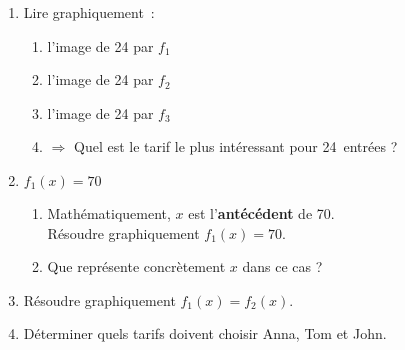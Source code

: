 \begin{enumerate}[1)~~~]

\item Lire graphiquement~:
		\begin{enumerate}
			\item l'image de 24 par $f_1~$	%
			\item l'image de 24 par $f_2~$	%
			\item l'image de 24 par $f_3~$	%
			\item $\Longrightarrow$ Quel est le tarif le plus intéressant pour 24~entrées ?	%
		\end{enumerate}


\newpage

\item $f_1(x)=70$
		\begin{enumerate}
			\item Mathématiquement, $x$ est l'\textbf{antécédent} de 70.\\ Résoudre graphiquement $f_1(x)=70$.	%
			\item Que représente concrètement $x$ dans ce cas ?
		\end{enumerate}
		

\item Résoudre graphiquement $f_1(x)=f_2(x)$.	%


\item Déterminer quels tarifs doivent choisir Anna, Tom et John.	%


\end{enumerate}

